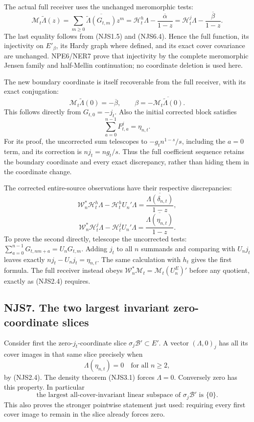 The actual full receiver uses the unchanged meromorphic tests: \[
\mathcal M_t\widetilde\Lambda(z)
=\sum_{m\ge0}\overline{\widetilde\Lambda(G_{t,m})}z^m
=\mathcal H_t^h\Lambda-\frac{\overline\alpha}{1-z}
=\mathcal H_t^j\Lambda-\frac{\overline\beta}{1-z}.
\tag{NJS6.5}
\] The last equality follows from (NJS1.5) and (NJS6.4). Hence the full
function, its injectivity on \(E'_\beta\), its Hardy graph where
defined, and its exact cover covariance are unchanged. NPE6/NER7 prove
that injectivity by the complete meromorphic Jensen family and
half-Mellin continuation; no coordinate deletion is used here.

The new boundary coordinate is itself recoverable from the full
receiver, with its exact conjugation: \[
\mathcal M_t\widetilde\Lambda(0)=-\overline\beta,
\qquad \beta=-\overline{\mathcal M_t\widetilde\Lambda(0)}.
\tag{NJS6.5a}
\] This follows directly from \(G_{t,0}=-j_t\). Also the initial
corrected block satisfies \[
\sum_{a=0}^{n-1}F^j_{t,a}=\eta_{n,t}.
\tag{NJS6.5b}
\] For its proof, the uncorrected sum telescopes to \(-g_t n^{1-s}/s\),
including the \(a=0\) term, and its correction is \(nj_t=ng_t/s\). Thus
the full coefficient sequence retains the boundary coordinate and every
exact discrepancy, rather than hiding them in the coordinate change.

The corrected entire-source observations have their respective
discrepancies: \[
\mathscr W_n^*\mathcal H_t^h\Lambda-\mathcal H_t^hU_n'\Lambda
=\frac{\overline{\Lambda(\delta_{n,t})}}{1-z},
\] \[
\mathscr W_n^*\mathcal H_t^j\Lambda-\mathcal H_t^jU_n'\Lambda
=\frac{\overline{\Lambda(\eta_{n,t})}}{1-z}.
\tag{NJS6.6}
\] To prove the second directly, telescope the uncorrected tests:
\(\sum_{a=0}^{n-1}G_{t,nm+a}=U_nG_{t,m}\). Adding \(j_t\) to all \(n\)
summands and comparing with \(U_nj_t\) leaves exactly
\(nj_t-U_nj_t=\eta_{n,t}\). The same calculation with \(h_t\) gives the
first formula. The full receiver instead obeys
\(\mathscr W_n^*\mathcal M_t=\mathcal M_t(U_n^E)'\) before any quotient,
exactly as (NJS2.4) requires.

\subsection{NJS7. The two largest invariant zero-coordinate
slices}\label{njs7.-the-two-largest-invariant-zero-coordinate-slices}

Consider first the zero-\(j_t\)-coordinate slice
\(\sigma_j\mathcal B'\subset E'\). A vector \((\Lambda,0)_j\) has all
its cover images in that same slice precisely when \[
\Lambda(\eta_{n,t})=0\quad\text{for all }n\ge2,
\tag{NJS7.1}
\] by (NJS2.4). The density theorem (NJS3.1) forces \(\Lambda=0\).
Conversely zero has this property. In particular \[
\boxed{\text{the largest all-cover-invariant linear subspace of }
\sigma_j\mathcal B'\text{ is }\{0\}.}
\tag{NJS7.2}
\] This also proves the stronger pointwise statement just used:
requiring every first cover image to remain in the slice already forces
zero.

